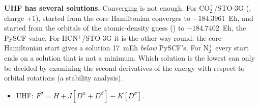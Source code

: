 \begin{pitfall}
\textbf{UHF has several solutions.} Converging is not enough. For CO$_2^+$/STO-3G (, charge $+1$),  started from the core Hamiltonian converges to $-184.3961$~Eh, and started from the orbitals of the atomic-density guess () to $-184.7402$~Eh, the PySCF value. For HCN$^+$/STO-3G it is the other way round: the core-Hamiltonian start gives a solution 17~mEh \emph{below} PySCF's. For N$_2^+$ every start ends on a solution that is not a minimum. Which solution is the lowest can only be decided by examining the second derivatives of the energy with respect to orbital rotations (a stability analysis).
\end{pitfall}

\begin{summary}
\begin{itemize}
\item UHF: $F^{\sigma} = H + J[D^{\alpha} + D^{\beta}] - K[D^{\sigma}]$.
\end{itemize}
\end{summary}
